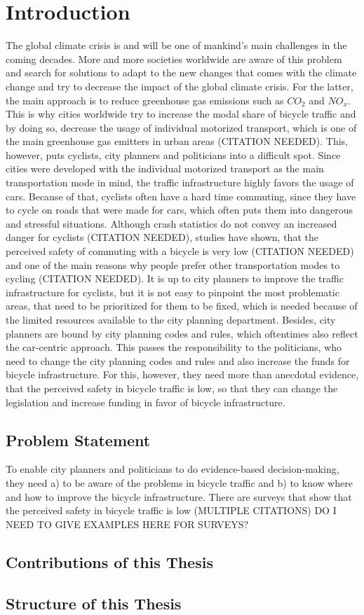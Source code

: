 \cleardoublepage
\chapter{Introduction}
\label{cha:introduction}
The global climate crisis is and will be one of mankind's main challenges in the coming decades.
More and more societies worldwide are aware of this problem and search for solutions to adapt to the new changes that comes with the climate change and try to decrease the impact of the global climate crisis.
For the latter, the main approach is to reduce greenhouse gas emissions such as $CO_{2}$ and $NO_{x}$.
This is why cities worldwide try to increase the modal share of bicycle traffic and by doing so, decrease the usage of individual motorized transport, which is one of the main greenhouse gas emitters in urban areas (CITATION NEEDED).
This, however, puts cyclists, city planners and politicians into a difficult spot.
Since cities were developed with the individual motorized transport as the main transportation mode in mind, the traffic infrastructure highly favors the usage of cars.
Because of that, cyclists often have a hard time commuting, since they have to cycle on roads that were made for cars, which often puts them into dangerous and stressful situations.
Although crash statistics do not convey an increased danger for cyclists (CITATION NEEDED), studies have shown, that the perceived safety of commuting with a bicycle is very low (CITATION NEEDED) and one of the main reasons why people prefer other transportation modes to cycling (CITATION NEEDED).
It is up to city planners to improve the traffic infrastructure for cyclists, but it is not easy to pinpoint the most problematic areas, that need to be prioritized for them to be fixed, which is needed because of the limited resources available to the city planning department.
Besides, city planners are bound by city planning codes and rules, which oftentimes also reflect the car-centric approach.
This passes the responsibility to the politicians, who need to change the city planning codes and rules and also increase the funds for bicycle infrastructure.
For this, however, they need more than anecdotal evidence, that the perceived safety in bicycle traffic is low, so that they can change the legislation and increase funding in favor of bicycle infrastructure.

\section{Problem Statement}
\label{sec:problem}
To enable city planners and politicians to do evidence-based decision-making, they need a) to be aware of the problems in bicycle traffic and b) to know where and how to improve the bicycle infrastructure.
There are surveys that show that the perceived safety in bicycle traffic is low (MULTIPLE CITATIONS)
DO I NEED TO GIVE EXAMPLES HERE FOR SURVEYS?

\section{Contributions of this Thesis}
\label{sec:contributions}

\section{Structure of this Thesis}
\label{sec:structure}